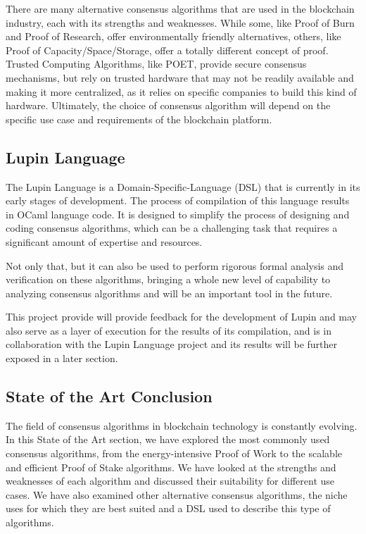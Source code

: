 There are many alternative consensus algorithms that are used in the blockchain industry, each with its strengths and weaknesses.
While some, like Proof of Burn and Proof of Research, offer environmentally friendly alternatives, others, like Proof of Capacity/Space/Sto\-rage, offer a totally different concept of proof.
Trusted Computing Algorithms, like POET, provide secure consensus mechanisms, but rely on trusted hardware that may not be readily available and making it more centralized, as it relies on specific companies to build this kind of hardware.
Ultimately, the choice of consensus algorithm will depend on the specific use case and requirements of the blockchain platform.





\subsection*{\textbf{Lupin Language}}
\label{lupin}

The Lupin Language is a Domain-Specific-Language (DSL) that is currently in its early stages of development. 
The process of compilation of this language results in OCaml language code.
It is designed to simplify the process of designing and coding consensus algorithms, which can be a challenging task that requires a significant amount of expertise and resources.

Not only that, but it can also be used to perform rigorous formal analysis and verification on these algorithms, bringing 
a whole new level of capability to analyzing consensus algorithms and will be an important tool in the future.

This project provide will provide feedback for the development of Lupin and may also serve as a layer of execution for the results of its compilation, and is in collaboration with the Lupin Language project and its results will be further exposed in a later section.


\subsection*{State of the Art Conclusion}
The field of consensus algorithms in blockchain technology is constantly evolving. In this State of the Art section, we have explored the most commonly used consensus algorithms, from the energy-intensive Proof of Work to the scalable and efficient Proof of Stake algorithms. We have looked at the strengths and weaknesses of each algorithm and discussed their suitability for different use cases. We have also examined other alternative consensus algorithms, the niche uses for which they are best suited and a DSL used to describe this type of algorithms.

